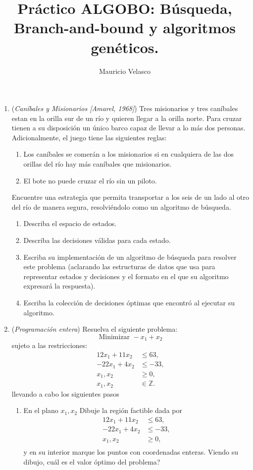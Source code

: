 \documentclass[12pt, a4paper]{article}
\date{}
\begin{document}
\title{Pr\'actico ALGOBO: Búsqueda, Branch-and-bound y algoritmos genéticos.}
\author{Mauricio Velasco}
\maketitle{}
\begin{enumerate}
\item({\it Caníbales y Misionarios [Amarel, 1968]}) Tres misionarios y tres caníbales estan en la orilla sur de un río y quieren llegar a la orilla norte. Para cruzar tienen a su disposición un único barco capaz de llevar a lo más dos personas. Adicionalmente, el juego tiene las siguientes reglas:
\begin{enumerate}
\item Los caníbales se comerán a los misionarios si en cualquiera de las dos orillas del río hay más caníbales que misionarios.
\item El bote no puede cruzar el río sin un piloto.
\end{enumerate}
Encuentre una estrategia que permita transportar a los seis de un lado al otro del río de manera segura, resolviéndolo como un algoritmo de búsqueda.

\begin{enumerate}
\item Describa el espacio de estados.
\item Describa las decisiones válidas para cada estado.
\item Escriba su implementación de un algoritmo de búsqueda para resolver este problema (aclarando las estructuras de datos que usa para representar estados y decisiones y el formato en el que su algoritmo expresará la respuesta). 
\item Escriba la colección de decisiones óptimas que encontró al ejecutar su algoritmo.
\end{enumerate}


\item ({\it Programación entera})  Resuelva el siguiente problema:
\[
\text{Minimizar } -x_1+x_2
\]
sujeto a las restricciones: 
\[
\begin{aligned}
12x_1+11x_2 &\leq 63, \\
-22x_1+4x_2 &\leq -33, \\
x_1, x_2 &\geq 0, \\
x_1, x_2 &\in \mathbb{Z}.
\end{aligned}
\]
llevando a cabo los siguientes pasos

\begin{enumerate}
\item En el plano $x_1,x_2$ Dibuje la región factible dada por
\[
\begin{aligned}
12x_1+11x_2 &\leq 63, \\
-22x_1+4x_2 &\leq -33, \\
x_1, x_2 &\geq 0, \\
\end{aligned}
\]
y en su interior marque los puntos con coordenadas enteras. Viendo su dibujo, cuál es el valor óptimo del problema?


\end{enumerate}
\end{enumerate}
\end{document}
